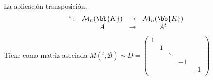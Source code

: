 \begin{observacion}
    La aplicación transposición,
    $$\begin{array}{cccc}
        ^t: & \mathcal{M}_n(\bb{K}) & \to & \mathcal{M}_n(\bb{K}) \\
         & A & \to & A^t
    \end{array}$$
    Tiene como matriz asociada $M(^t, \mathcal{B}) \sim D = \left( \begin{array}{ccccc}
        1 & & & &\\
        & 1 & & &\\
        & & \ddots & &\\
        & & & -1 & \\
        & & & & -1 \\  
    \end{array} \right)$
\end{observacion}


